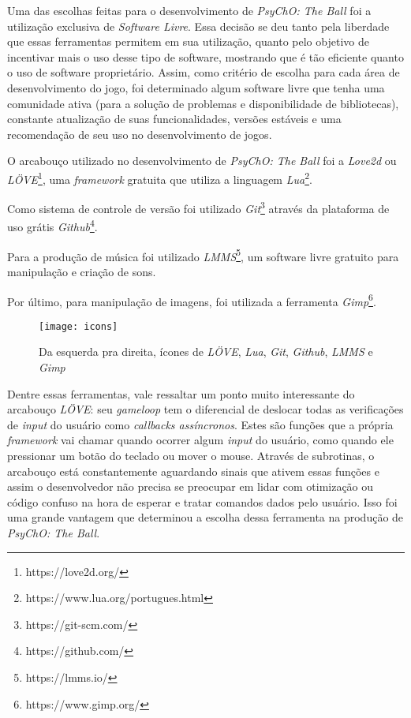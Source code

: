 Uma das escolhas feitas para o desenvolvimento de \textit{PsyChO: The Ball} foi a utilização exclusiva de \textit{Software Livre}. Essa decisão se deu tanto pela liberdade que essas ferramentas permitem em sua utilização, quanto pelo objetivo de incentivar mais o uso desse tipo de software, mostrando que é tão eficiente quanto o uso de software proprietário. Assim, como critério de escolha para cada área de desenvolvimento do jogo, foi determinado algum software livre que tenha uma comunidade ativa (para a solução de problemas e disponibilidade de bibliotecas), constante atualização de suas funcionalidades, versões estáveis e uma recomendação de seu uso no desenvolvimento de jogos.

O arcabouço utilizado no desenvolvimento de \textit{PsyChO: The Ball} foi a \textit{Love2d} ou \textit{LÖVE}\footnote{https://love2d.org/}, uma \textit{framework} gratuita que utiliza a linguagem \textit{Lua}\footnote{https://www.lua.org/portugues.html}.

Como sistema de controle de versão foi utilizado \textit{Git}\footnote{https://git-scm.com/} através da plataforma de uso grátis \textit{Github}\footnote{https://github.com/}.

Para a produção de música foi utilizado \textit{LMMS}\footnote{https://lmms.io/}, um software livre gratuito para manipulação e criação de sons.

Por último, para manipulação de imagens, foi utilizada a ferramenta \textit{Gimp}\footnote{https://www.gimp.org/}.

\begin{figure}[h!]
\texttt{[image: icons]}
\centering
\caption{Da esquerda pra direita, ícones de \textit{LÖVE}, \textit{Lua}, \textit{Git}, \textit{Github}, \textit{LMMS} e \textit{Gimp}}
\end{figure}

Dentre essas ferramentas, vale ressaltar um ponto muito interessante do arcabouço \textit{LÖVE}: seu \textit{gameloop} tem o diferencial de deslocar todas as verificações de \textit{input} do usuário como \textit{callbacks assíncronos}. Estes são funções que a própria \textit{framework} vai chamar quando ocorrer algum \textit{input} do usuário, como quando ele pressionar um botão do teclado ou mover o mouse. Através de subrotinas, o arcabouço está constantemente aguardando sinais que ativem essas funções e assim o desenvolvedor não precisa se preocupar em lidar com otimização ou código confuso na hora de esperar e tratar comandos dados pelo usuário. Isso foi uma grande vantagem que determinou a escolha dessa ferramenta na produção de \textit{PsyChO: The Ball}.

